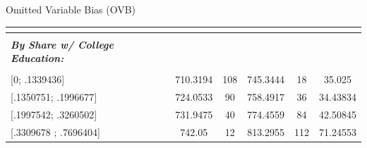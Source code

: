 \documentclass[notes,10pt, aspectratio=169]{beamer}
\begin{document}
\begin{frame}{Omitted Variable Bias (OVB)}
\begin{center}
{\begin{tabular}{l|cc|cc|c|}
            \multicolumn{1}{|l|}{} &                                                                &                                &                                                                &                                & \multicolumn{1}{c|}{}                                             \\\hline
            \multicolumn{1}{|l|}{} &                                                                &                                &                                                                &                                & \multicolumn{1}{c|}{}                                             \\
            \multicolumn{1}{|l|}{\textbf{\textit{By Share w/ College Education:}}} &                                                                &                                &                                                                &                                & \multicolumn{1}{c|}{}                                             \\
            \multicolumn{1}{|l|}{} &                                                                &                                &                                                                &                                & \multicolumn{1}{c|}{}                                             \\
            \multicolumn{1}{|l|}{{[}0; .1339436{]}}                       & 710.3194                                                       & 108                            & 745.3444                                                       & 18                             & \multicolumn{1}{c|}{35.025}                                       \\
            \multicolumn{1}{|l|}{{[}.1350751; .1996677{]}}                & 724.0533                                                       & 90                             & 758.4917                                                       & 36                             & \multicolumn{1}{c|}{34.43834}                                     \\
            \multicolumn{1}{|l|}{{[}.1997542; .3260502{]}}                & 731.9475                                                       & 40                             & 774.4559                                                       & 84                             & \multicolumn{1}{c|}{42.50845}                                     \\
            \multicolumn{1}{|l|}{{[}.3309678 ; .7696404{]}}               & 742.05                                                         & 12                             & 813.2955                                                       & 112                            & \multicolumn{1}{c|}{71.24553}                                     \\ \hline
            \end{tabular}
            
}

\end{center}

\end{frame}
\end{document}
